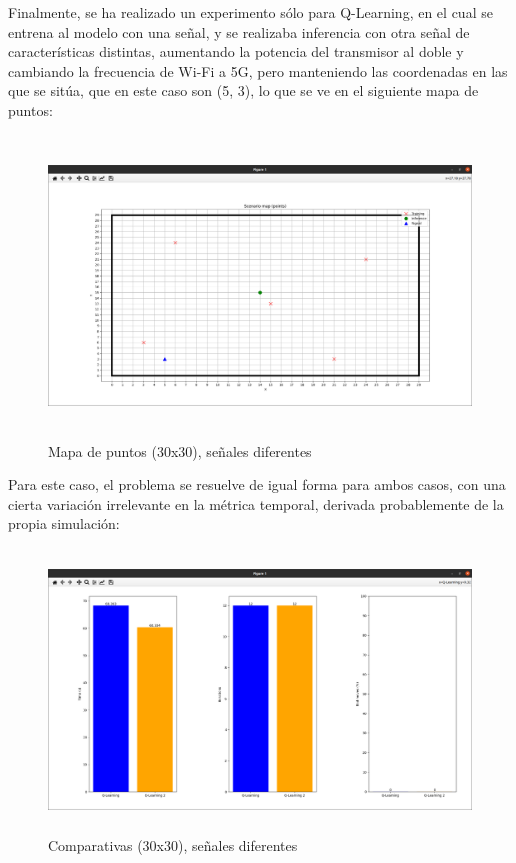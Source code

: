 Finalmente, se ha realizado un experimento sólo para Q-Learning, en el cual se entrena al modelo con una señal, y se realizaba inferencia con otra señal de características distintas, aumentando la potencia del transmisor al doble y cambiando la frecuencia de Wi-Fi a 5G, pero manteniendo las coordenadas en las que se sitúa, que en este caso son (5, 3), lo que se ve en el siguiente mapa de puntos:\\

\begin{figure} [H]
    \begin{center}
    \includegraphics[height=8cm]{imagenes/cap4/25_mapa_p_diff.png}
    \end{center}
    \caption[Mapa de puntos (30x30), señales diferentes]{Mapa de puntos (30x30), señales diferentes}
    \label{fig:map_p_diff_30}
\end{figure}

Para este caso, el problema se resuelve de igual forma para ambos casos, con una cierta variación irrelevante en la métrica temporal, derivada probablemente de la propia simulación:\\

\begin{figure} [H]
    \begin{center}
    \includegraphics[height=7.5cm]{imagenes/cap4/26_comp_diff.png}
    \end{center}
    \caption[Comparativas (30x30), señales diferentes]{Comparativas (30x30), señales diferentes}
    \label{fig:comp_diff_30}
\end{figure}

